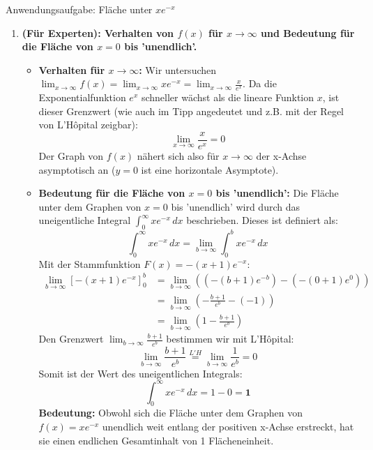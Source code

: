 \begin{loesungsumgebung}{Anwendungsaufgabe: Fläche unter $xe^{-x}$}
\begin{enumerate}[label=(\alph*)]
    \item \textbf{(Für Experten): Verhalten von $f(x)$ für $x \to \infty$ und Bedeutung für die Fläche von $x=0$ bis 'unendlich'.}
    \begin{itemize}
        \item \textbf{Verhalten für $x \to \infty$:}
        Wir untersuchen $\lim_{x \to \infty} f(x) = \lim_{x \to \infty} xe^{-x} = \lim_{x \to \infty} \frac{x}{e^x}$.
        Da die Exponentialfunktion $e^x$ schneller wächst als die lineare Funktion $x$, ist dieser Grenzwert (wie auch im Tipp angedeutet und z.B. mit der Regel von L'Hôpital zeigbar):
        $$ \lim_{x \to \infty} \frac{x}{e^x} = 0 $$
        Der Graph von $f(x)$ nähert sich also für $x \to \infty$ der x-Achse asymptotisch an ($y=0$ ist eine horizontale Asymptote).
        \item \textbf{Bedeutung für die Fläche von $x=0$ bis 'unendlich':}
        Die Fläche unter dem Graphen von $x=0$ bis 'unendlich' wird durch das uneigentliche Integral $\int_0^\infty xe^{-x} \,dx$ beschrieben. Dieses ist definiert als:
        $$ \int_0^\infty xe^{-x} \,dx = \lim_{b \to \infty} \int_0^b xe^{-x} \,dx $$
        Mit der Stammfunktion $F(x) = -(x+1)e^{-x}$:
        \begin{align*} \lim_{b \to \infty} [-(x+1)e^{-x}]_0^b &= \lim_{b \to \infty} \left( (-(b+1)e^{-b}) - (-(0+1)e^0) \right) \\ &= \lim_{b \to \infty} \left( -\frac{b+1}{e^b} - (-1) \right) \\ &= \lim_{b \to \infty} \left( 1 - \frac{b+1}{e^b} \right) \end{align*}
        Den Grenzwert $\lim_{b \to \infty} \frac{b+1}{e^b}$ bestimmen wir mit L'Hôpital:
        $$ \lim_{b \to \infty} \frac{b+1}{e^b} \stackrel{L'H}{=} \lim_{b \to \infty} \frac{1}{e^b} = 0 $$
        Somit ist der Wert des uneigentlichen Integrals:
        $$ \int_0^\infty xe^{-x} \,dx = 1 - 0 = \mathbf{1} $$
        \textbf{Bedeutung:} Obwohl sich die Fläche unter dem Graphen von $f(x)=xe^{-x}$ unendlich weit entlang der positiven x-Achse erstreckt, hat sie einen endlichen Gesamtinhalt von 1 Flächeneinheit. 
    \end{itemize}
\end{enumerate}

\end{loesungsumgebung}


